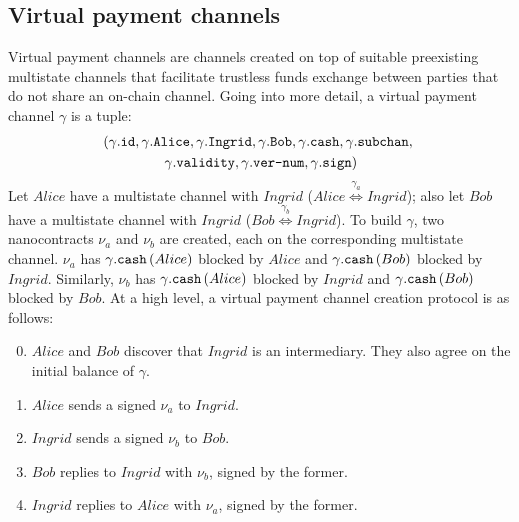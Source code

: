 \subsection{Virtual payment channels}
  Virtual payment channels are channels created on top of suitable preexisting multistate
  channels that facilitate trustless funds exchange between parties that do not share an
  on-chain channel. Going into more detail, a virtual payment channel $\gamma$ is a tuple:
  \begin{gather*}
    \left(\gamma\mbox{.\texttt{id}}, \gamma\mbox{.\texttt{Alice}},
    \gamma\mbox{.\texttt{Ingrid}}, \gamma\mbox{.\texttt{Bob}},
    \gamma\mbox{.\texttt{cash}}, \gamma\mbox{.\texttt{subchan}}, \right. \\
    \left.\gamma\mbox{.\texttt{validity}}, \gamma\mbox{.\texttt{ver-num}},
    \gamma\mbox{.\texttt{sign}}\right)
  \end{gather*}
  Let $Alice$ have a multistate channel with $Ingrid$ ($Alice
  \overset{\gamma_a}{\Leftrightarrow} Ingrid$); also let $Bob$ have a multistate channel
  with $Ingrid$ ($Bob \overset{\gamma_b}{\Leftrightarrow} Ingrid$). To build $\gamma$, two
  nanocontracts $\nu_a$ and $\nu_b$ are created, each on the corresponding multistate
  channel. $\nu_a$ has $\gamma\mbox{.\texttt{cash}}\left(Alice\right)$ blocked by $Alice$
  and $\gamma\mbox{.\texttt{cash}}\left(Bob\right)$ blocked by $Ingrid$. Similarly,
  $\nu_b$ has $\gamma\mbox{.\texttt{cash}}\left(Alice\right)$ blocked by $Ingrid$ and
  $\gamma\mbox{.\texttt{cash}}\left(Bob\right)$ blocked by $Bob$. At a high level, a
  virtual payment channel creation protocol is as follows:
  \begin{enumerate}
  \setcounter{enumi}{-1}
    \item $Alice$ and $Bob$ discover that $Ingrid$ is an intermediary. They also agree on
    the initial balance of $\gamma$.
    \item $Alice$ sends a signed $\nu_a$ to $Ingrid$.
    \item $Ingrid$ sends a signed $\nu_b$ to $Bob$.
    \item $Bob$ replies to $Ingrid$ with $\nu_b$, signed by the former.
    \item $Ingrid$ replies to $Alice$ with $\nu_a$, signed by the former.
  \end{enumerate}
